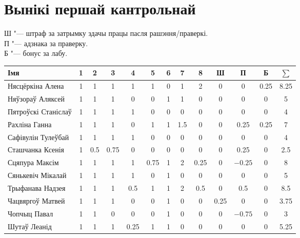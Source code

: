 \documentclass[12pt, a4paper]{extarticle}
\begin{document}
	\section{Вынікі першай кантрольнай}
	\noindent Ш "--- штраф за затрымку здачы працы пасля рашэння/праверкі. \\
	П "--- адзнака за праверку. \\
	Б "--- бонус за лабу.
	\begin{table}[H]
		\begin{tabular}{|l|c|c|c|c|c|c|c|c|c|c|c|c|}
			\hline
			Імя                 & 1 &  2  &  3   &  4   &  5   & 6 &  7  &  8   &  Ш   &    П    &  Б   & $\sum$ \\ \hline
			Нясцёркіна Алена    & 1 &  1  &  1   &  1   &  1   & 0 &  1  &  2   &  0   &    0    & 0.25 &  8.25  \\ \hline
			Няўзораў Аляксей    & 1 &  1  &  1   &  0   &  0   & 1 &  1  &  0   &  0   &    0    &  0   &   5    \\ \hline
			Пятроўскі Станіслаў & 1 &  1  &  1   &  1   &  0   & 0 &  0  &  0   &  0   &    0    &  0   &   4    \\ \hline
			Рахліна Ганна       & 1 &  1  &  1   &  0   &  1   & 1 & 1.5 &  0   &  0   &   0.25  & 0.25 &   7    \\ \hline
			Сафівулін Тулеўбай  & 1 &  1  &  1   &  1   &  0   & 0 &  0  &  0   &  0   &    0    &  0   &   4    \\ \hline
			Сташчанка Ксенія    & 1 & 0.5 & 0.75 &  0   &  0   & 0 &  0  &  0   &  0   &   0.25  &  0   &   2.5  \\ \hline
			Сцяпура Максім      & 1 &  1  &  1   &  1   & 0.75 & 1 &  2  & 0.25 &  0   & $-0.25$ &  0   &   8    \\ \hline
			Сянькевіч Мікалай   & 1 &  1  &  1   &  1   &  0   & 1 &  0  &  0   &  0   &    0    &  0   &   5    \\ \hline
			Трыфанава Надзея    & 1 &  1  &  1   &  0.5 &  1   & 1 &  2  &  0.5 &  0   &   0.5   &  0   &   8.5  \\ \hline
			Чацвяргоў Матвей    & 1 &  1  &  1   &  0   &  0   & 1 &  0  &  0   & 0.25 &    0    &  0   &  3.75  \\ \hline
			Чопчыц Павал        & 1 &  1  &  0   &  0   &  0   & 1 &  0  &  0   &  0   & $-0.75$ &  0   &   3    \\ \hline
			Шутаў Леанід        & 1 &  1  &  1   & 0.25 &  1   & 1 &  0  &  0   &  0   &    0    &  0   &  5.25  \\ \hline
		\end{tabular}
	\end{table}
\end{document}
